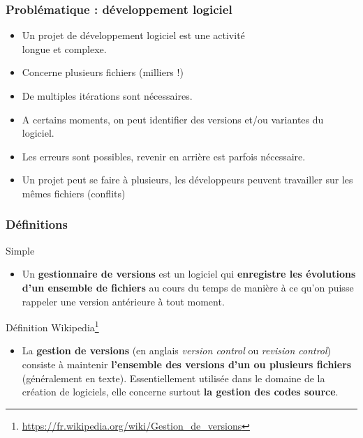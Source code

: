 \documentclass[table,tikz,12pt,svgnames]{beamer}
\begin{document}
\begin{frame}
	\frametitle{Problématique : développement logiciel}
	\begin{block}{}
    \begin{adjustwidth}{-0.3cm}{-1.4cm}{}
		\begin{itemize}
			\item Un \textcolor{title}{projet} de développement logiciel est une activité\\
			longue et complexe.
			\item Concerne plusieurs \textcolor{title}{fichiers} (milliers !)
			\item De multiples \textcolor{title}{itérations} sont nécessaires.
			\item A certains moments, on peut identifier des \textcolor{title}{versions} et/ou \textcolor{title}{variantes} du logiciel.
			\item Les erreurs sont possibles, \textcolor{title}{revenir en arrière} est parfois nécessaire.
			\item Un projet peut se faire à plusieurs, les développeurs peuvent travailler sur les mêmes fichiers (\textcolor{title}{conflits})
		\end{itemize}
	\end{adjustwidth}
	\end{block}
\end{frame}

\begin{frame}
	\frametitle{Définitions}
		\begin{block}{Simple}
			\begin{itemize}
				\item Un \textbf{gestionnaire de versions} est un logiciel qui \textbf{enregistre les évolutions d’un ensemble de fichiers} au cours du temps de manière à ce qu'on puisse rappeler une version antérieure à̀ tout moment.
			\end{itemize}
		\end{block}
		\begin{block}{Définition Wikipedia\footnote{\url{https://fr.wikipedia.org/wiki/Gestion\_de\_versions}}}
			\begin{itemize}
				\item La \textbf{gestion de versions} (en anglais \textit{version control} ou \textit{revision control}) consiste à maintenir \textbf{l'ensemble des versions d'un ou plusieurs fichiers} (généralement en texte).
				Essentiellement utilisée dans le domaine de la création de logiciels, elle concerne surtout \textbf{la gestion des codes source}.
			\end{itemize}
		\end{block}
\end{frame}
\end{document}
